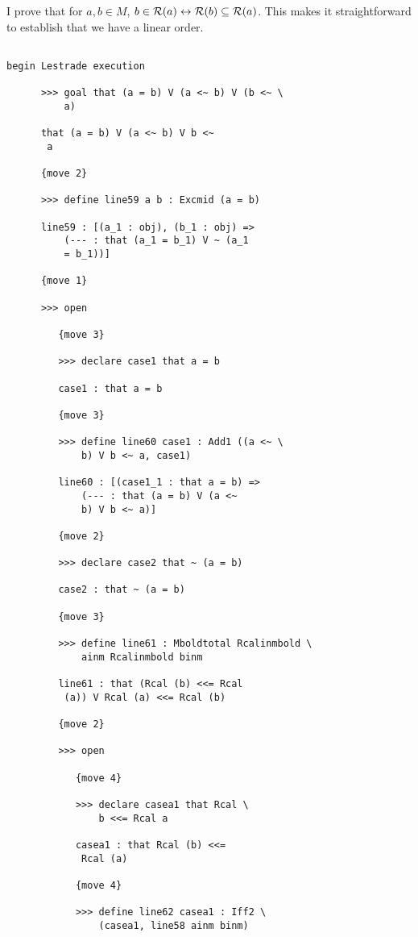 \documentclass[12pt]{article}
\begin{document}
I prove that for $a,b \in M$, $b \in {\cal R}(a) \leftrightarrow {\cal R}(b) \subseteq {\cal R}(a)$.  This makes it straightforward to establish that we have a linear order.

\begin{verbatim}

begin Lestrade execution

      >>> goal that (a = b) V (a <~ b) V (b <~ \
          a)

      that (a = b) V (a <~ b) V b <~ 
       a

      {move 2}

      >>> define line59 a b : Excmid (a = b)

      line59 : [(a_1 : obj), (b_1 : obj) => 
          (--- : that (a_1 = b_1) V ~ (a_1 
          = b_1))]

      {move 1}

      >>> open

         {move 3}

         >>> declare case1 that a = b

         case1 : that a = b

         {move 3}

         >>> define line60 case1 : Add1 ((a <~ \
             b) V b <~ a, case1)

         line60 : [(case1_1 : that a = b) => 
             (--- : that (a = b) V (a <~ 
             b) V b <~ a)]

         {move 2}

         >>> declare case2 that ~ (a = b)

         case2 : that ~ (a = b)

         {move 3}

         >>> define line61 : Mboldtotal Rcalinmbold \
             ainm Rcalinmbold binm

         line61 : that (Rcal (b) <<= Rcal 
          (a)) V Rcal (a) <<= Rcal (b)

         {move 2}

         >>> open

            {move 4}

            >>> declare casea1 that Rcal \
                b <<= Rcal a

            casea1 : that Rcal (b) <<= 
             Rcal (a)

            {move 4}

            >>> define line62 casea1 : Iff2 \
                (casea1, line58 ainm binm)


\end{verbatim}
\end{document}
